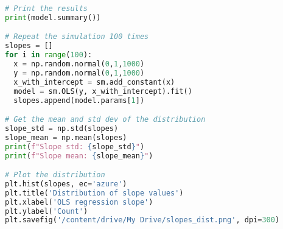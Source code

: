 \documentclass{article}
\begin{document}
\begin{enumerate}[label={(\alph*)}]
\begin{lstlisting}[language=Python, caption=Standard Error and Confidence]
# Print the results
print(model.summary())

# Repeat the simulation 100 times
slopes = []
for i in range(100):
  x = np.random.normal(0,1,1000)
  y = np.random.normal(0,1,1000)
  x_with_intercept = sm.add_constant(x)
  model = sm.OLS(y, x_with_intercept).fit()
  slopes.append(model.params[1])

# Get the mean and std dev of the distribution
slope_std = np.std(slopes)
slope_mean = np.mean(slopes)
print(f"Slope std: {slope_std}")
print(f"Slope mean: {slope_mean}")

# Plot the distribution
plt.hist(slopes, ec='azure')
plt.title('Distribution of slope values')
plt.xlabel('OLS regression slope')
plt.ylabel('Count')
plt.savefig('/content/drive/My Drive/slopes_dist.png', dpi=300)
\end{lstlisting}
    
\end{enumerate}
\pagebreak
\end{document}
